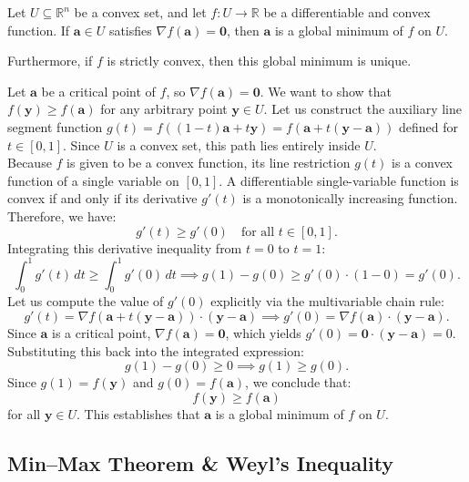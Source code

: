 \begin{theorem}
	Let $U \subseteq \mathbb{R}^n$ be a convex set, and let $f: U \to \mathbb{R}$ be a differentiable and convex function. If $\mathbf{a} \in U$ satisfies $\nabla f(\mathbf{a}) = \mathbf{0}$, then $\mathbf{a}$ is a global minimum of $f$ on $U$.
\end{theorem}

\begin{remark}
	Furthermore, if $f$ is strictly convex, then this global minimum is unique.
\end{remark}

\begin{pfbox}
	Let $\mathbf{a}$ be a critical point of $f$, so $\nabla f(\mathbf{a}) = \mathbf{0}$. We want to show that $f(\mathbf{y}) \ge f(\mathbf{a})$ for any arbitrary point $\mathbf{y} \in U$. Let us construct the auxiliary line segment function $g(t) = f((1-t)\mathbf{a} + t\mathbf{y}) = f(\mathbf{a} + t(\mathbf{y}-\mathbf{a}))$ defined for $t \in [0, 1]$. Since $U$ is a convex set, this path lies entirely inside $U$.\\
	Because $f$ is given to be a convex function, its line restriction $g(t)$ is a convex function of a single variable on $[0, 1]$. A differentiable single-variable function is convex if and only if its derivative $g'(t)$ is a monotonically increasing function. Therefore, we have:
	$$
		g'(t) \ge g'(0) \quad \text{for all } t \in [0, 1].
	$$
	Integrating this derivative inequality from $t=0$ to $t=1$:
	$$
		\int_0^1 g'(t) \, dt \ge \int_0^1 g'(0) \, dt \implies g(1) - g(0) \ge g'(0) \cdot (1 - 0) = g'(0).
	$$
	Let us compute the value of $g'(0)$ explicitly via the multivariable chain rule:
	$$
		g'(t) = \nabla f(\mathbf{a} + t(\mathbf{y}-\mathbf{a})) \cdot (\mathbf{y}-\mathbf{a}) \implies g'(0) = \nabla f(\mathbf{a}) \cdot (\mathbf{y}-\mathbf{a}).
	$$
	Since $\mathbf{a}$ is a critical point, $\nabla f(\mathbf{a}) = \mathbf{0}$, which yields $g'(0) = \mathbf{0} \cdot (\mathbf{y}-\mathbf{a}) = 0$. Substituting this back into the integrated expression:
	$$
		g(1) - g(0) \ge 0 \implies g(1) \ge g(0).
	$$
	Since $g(1) = f(\mathbf{y})$ and $g(0) = f(\mathbf{a})$, we conclude that:
	$$
		f(\mathbf{y}) \ge f(\mathbf{a})
	$$
	for all $\mathbf{y} \in U$. This establishes that $\mathbf{a}$ is a global minimum of $f$ on $U$.
\end{pfbox}



\subsection{Min--Max Theorem \& Weyl's Inequality}


